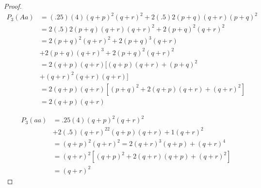 \documentclass{tufte-book}
\theoremstyle{mytheoremstyle}
\theoremstyle{mylemstyle}
\theoremstyle{mydefstyle}
\begin{document}
\begin{enumerate}
\begin{proof}
\begin{align*}
P_3(Aa) &= (.25)(4)(q+p)^2(q+r)^2 + 2(.5)2(p+q)(q+r)(p+q)^2\\
&= 2(.5)2(p+q)(q+r)(q+r)^2 + 2(p+q)^2(q+r)^2\\
&= 2(p+q)^2(q+r)^2 + 2(p+q)^3(q+r)\\
&+ 2(p+q)(q+r)^3 + 2(p+q)^2(q+r)^2\\
&= 2(q+p)(q+r)[(q+p)(q+r) + (p+q)^2\\
&+ (q+r)^2 (q+r)(q+r)]\\
&= 2(q+p)(q+r)[(p+q)^2 + 2(q+p)(q+r) +(q+r)^2]\\
&= 2(q+p)(q+r)
\end{align*}

\begin{align*}
P_3(aa) &= .25(4)(q+p)^2(q+r)^2\\
&+ 2(.5)(q+r)^22(q+p)(q+r) + 1(q+r)^2\\
&= (q+p)^2(q+r)^2 = 2(q+r)^3(q+p) + (q+r)^4\\
&= (q+r)^2[(q+p)^2 + 2(q+r)(q+p) + (q+r)^2]\\
&= (q+r)^2
\end{align*}

\end{proof}

\end{enumerate}
\end{document}
